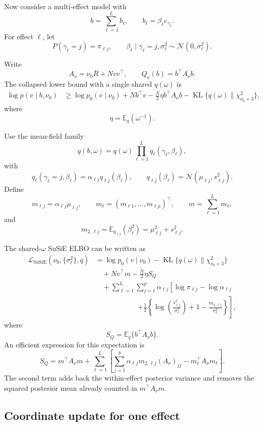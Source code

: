 \documentclass[11pt]{article}
\newcommand{\Rbar}{\bar R}
\newcommand{\nuo}{\nu_0}
\newcommand{\E}{\mathbb E}
\newcommand{\KL}{\operatorname{KL}}
\newcommand{\Normal}{\mathcal N}
\newcommand{\chisq}{\chi^2}
\begin{document}
Now consider a multi-effect model with
\[
b=\sum_{\ell=1}^L b_\ell,
\qquad
b_\ell=\beta_\ell e_{\gamma_\ell}.
\]
For effect \(\ell\), let
\[
P(\gamma_\ell=j)=\pi_{\ell j},
\qquad
\beta_\ell\mid\gamma_\ell=j,\sigma_\ell^2
\sim
\Normal(0,\sigma_\ell^2).
\]

Write
\[
A_\nu=\nuo\Rbar+Nvv^\top,
\qquad
Q_\nu(b)=b^\top A_\nu b.
\]
The collapsed lower bound with a single shared \(q(\omega)\) is
\begin{align}
\log p(v\mid b,\nuo)
&\geq
\log p_0(v\mid\nuo)
+
Nb^\top v
-
\frac N2\eta b^\top A_\nu b
-
\KL\{q(\omega)\|\chisq_{\nuo+3}\},
\end{align}
where
\[
\eta=\E_q(\omega^{-1}).
\]

Use the mean-field family
\[
q(b,\omega)
=
q(\omega)
\prod_{\ell=1}^L
q_\ell(\gamma_\ell,\beta_\ell),
\]
with
\[
q_\ell(\gamma_\ell=j,\beta_\ell)
=
\alpha_{\ell j}q_{\ell j}(\beta_\ell),
\qquad
q_{\ell j}(\beta_\ell)
=
\Normal(\mu_{\ell j},s_{\ell j}^2).
\]
Define
\[
m_{\ell j}=\alpha_{\ell j}\mu_{\ell j},
\qquad
m_\ell=(m_{\ell 1},\dots,m_{\ell p})^\top,
\qquad
m=\sum_{\ell=1}^L m_\ell,
\]
and
\[
m_{2,\ell j}
=
\E_{q_{\ell j}}(\beta_\ell^2)
=
\mu_{\ell j}^2+s_{\ell j}^2.
\]

The shared-\(\omega\) SuSiE ELBO can be written as
\begin{align}
\mathcal L_{\mathrm{SuSiE}}(\nuo,\{\sigma_\ell^2\},q)
&=
\log p_0(v\mid\nuo)
-
\KL\{q(\omega)\|\chisq_{\nuo+3}\}
\nonumber\\
&\quad
+
N v^\top m
-
\frac N2\eta S_Q
\nonumber\\
&\quad
+
\sum_{\ell=1}^L
\sum_{j=1}^p
\alpha_{\ell j}
\left[
\log\pi_{\ell j}
-
\log\alpha_{\ell j}
\right.
\nonumber\\
&\qquad\qquad\qquad\left.
+
\frac12
\left\{
\log\left(\frac{s_{\ell j}^2}{\sigma_\ell^2}\right)
+
1
-
\frac{m_{2,\ell j}}{\sigma_\ell^2}
\right\}
\right],
\label{eq:susie_shared_elbo}
\end{align}
where
\[
S_Q
=
\E_q\{b^\top A_\nu b\}.
\]
An efficient expression for this expectation is
\[
S_Q
=
m^\top A_\nu m
+
\sum_{\ell=1}^L
\left[
\sum_{j=1}^p
\alpha_{\ell j}m_{2,\ell j}(A_\nu)_{jj}
-
m_\ell^\top A_\nu m_\ell
\right].
\]
The second term adds back the within-effect posterior variance and
removes the squared posterior mean already counted in \(m^\top A_\nu m\).

\subsection*{Coordinate update for one effect}
\end{document}
